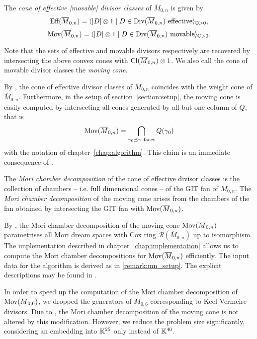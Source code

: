 \begin{defi}
	The \emph{cone of effective [movable] divisor classes} of $\overline{M}_{0,n}$ is given by
	$$\Eff(\overline{M}_{0,n}) = \langle [D] \tensor 1 \mid D\in\Div(\overline{M}_{0,n})\ \text{effective} \rangle_{\rational{> 0}},$$
	$$\text{Mov}(\overline{M}_{0,n}) = \langle [D] \otimes 1 \mid D\in\text{Div}(\overline{M}_{0,n})\ \text{movable} \rangle_{\mathbb{Q}{> 0}}.$$
	
	Note that the sets of effective and movable divisors respectively are recovered by intersecting the above convex cones with $\text{Cl}(\overline{M}_{0,n}) \otimes 1$. We also call the cone of movable divisor classes the \emph{moving cone}.
\end{defi}

\begin{remark}
	\label{remark:cone_of_divisor_classes_in_mn_context}
	By \cite[Proposition 3.3.2.1]{cox_rings}, the cone of effective divisor classes of $\overline{M}_{0,n}$ coincides with the weight cone of $\overline{M}_{0,n}$. Furthermore, in the setup of section~\ref{section:setup}, the moving cone is easily computed by intersecting all cones generated by all but one column of $Q$, that is
	$$\text{Mov}(\overline{M}_{0,n}) = \bigcap_{\gamma_0 \preceq \gamma\ \mathrm{facet}} Q(\gamma_0)$$
	with the notation of chapter~\ref{chap:algorithm}. This claim is an immediate consequence of \cite[Proposition 3.3.2.3]{cox_rings}.
\end{remark}

\begin{defi}
	The \emph{Mori chamber decomposition} of the cone of effective divisor classes is the collection of chambers -- i.e. full dimensional cones -- of the GIT fan of $\overline{M}_{0,n}$. The \emph{Mori chamber decomposition} of the moving cone arises from the chambers of the fan obtained by intersecting the GIT fan with $\text{Mov}(\overline{M}_{0,n})$.
\end{defi}

By \cite[Remark 3.3.4.2]{cox_rings}, the Mori chamber decomposition of the moving cone  $\text{Mov}(\overline{M}_{0,n})$ parametrises all Mori dream spaces with Cox ring $\mathcal{R}(\overline{M}_{0,n})$ up to isomorphism. The implementation described in chapter~\ref{chap:implementation} allows us to compute the Mori chamber decompositions for $\text{Mov}(\overline{M}_{0,n})$ efficiently. The input data for the algorithm is derived as in \ref{remark:mn_setup}. The explicit descriptions may be found in \cite{gitfan_symmetry}.

In order to speed up the computation of the Mori chamber decomposition of $\text{Mov}(\overline{M}_{0,6})$, we dropped the generators of $\overline{M}_{0,6}$ corresponding to Keel-Vermeire divisors. Due to \cite[Remark 6.7]{gitfan_symmetry}, the Mori chamber decomposition of the moving cone is not altered by this modification. However, we reduce the problem size significantly, considering an embedding into $\mathbb{K}^{25}$ only instead of $\mathbb{K}^{40}$.
